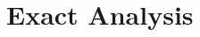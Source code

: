 \documentclass[epsfig,12pt]{article}
\def\beq{\begin{equation}}
\def\eeq{\end{equation}}
\def\beq{\begin{equation}}
\def\eeq{\end{equation}}
\begin{document}
	

	





\newpage
\section{Exact Analysis}
\setcounter{equation}{0}
\end{document}
